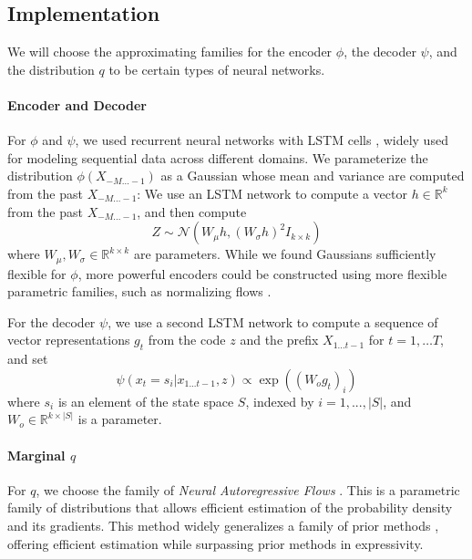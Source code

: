\documentclass[11pt,letterpaper]{article}
\begin{document}
\subsection{Implementation}
We will choose the approximating families for the encoder $\phi$, the decoder $\psi$, and the distribution $q$ to be certain types of neural networks.
\paragraph{Encoder and Decoder}
For $\phi$ and $\psi$, we used recurrent neural networks with LSTM cells \citep{hochreiter-long-1997}, widely used for modeling sequential data across different domains.
We parameterize the distribution $\phi(X_{-M\dots-1})$ as a Gaussian whose mean and variance are computed from the past $X_{-M\dots-1}$:
We use an LSTM network to compute a vector $h \in \mathbb{R}^k$ from the past $X_{-M\dots-1}$, and then compute
\begin{equation}
	Z \sim \mathcal{N}(W_\mu h, (W_\sigma h)^2 I_{k\times k})
\end{equation}
where $W_\mu, W_\sigma \in \mathbb{R}^{k\times k}$ are parameters.
While we found Gaussians sufficiently flexible for $\phi$, more powerful encoders could be constructed using more flexible parametric families, such as normalizing flows \citep{rezende-variational-2015, kingma-improving-2016}.

For the decoder $\psi$, we use a second LSTM network to compute a sequence of vector representations $g_t$ from the code $z$ and the prefix $X_{1\dots t-1}$ for $t = 1, \dots T$, and set
\begin{equation}
	\psi(x_t = s_i|x_{1...t-1}, z) \propto \exp((W_o g_t)_i)
\end{equation}
where $s_i$ is an element of the state space $S$, indexed by $i=1, ..., |S|$, and $W_o \in \mathbb{R}^{k \times |S|}$ is a parameter.


\paragraph{Marginal $q$}
For $q$, we choose the family of \emph{Neural Autoregressive Flows} \citep{huang-neural-2018}. 
This is a parametric family of distributions that allows efficient estimation of the probability density and its gradients.
This method widely generalizes a family of prior methods \citep{rezende-variational-2015, kingma-improving-2016, papamakarios-masked-2017}, offering efficient estimation while surpassing prior methods in expressivity.
\end{document}
